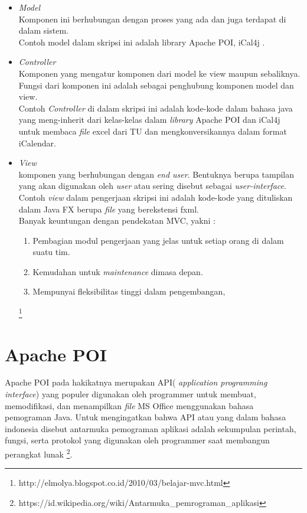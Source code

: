 \begin{itemize}
	\item \textit{Model}\\
	Komponen ini berhubungan dengan proses yang ada dan juga terdapat di dalam sistem.\\
	Contoh model dalam skripsi ini adalah library Apache POI, iCal4j .
	\item \textit{Controller}\\
	Komponen yang mengatur komponen dari model ke view maupun sebaliknya. Fungsi dari komponen ini adalah sebagai penghubung komponen model dan view.\\
	Contoh \textit{Controller} di dalam skripsi ini adalah kode-kode dalam bahasa java yang meng-inherit dari kelas-kelas dalam \textit{library} Apache POI dan iCal4j untuk membaca \textit{file} excel dari TU dan mengkonversikannya dalam format iCalendar.
	\item \textit{View}\\
	komponen yang berhubungan dengan \textit{end user}. Bentuknya berupa tampilan yang akan digunakan oleh \textit{user} atau sering disebut sebagai \textit{user-interface}.
	Contoh \textit{view} dalam pengerjaan skripsi ini adalah kode-kode yang dituliskan dalam Java FX berupa \textit{file} yang berekstensi fxml.\\
	Banyak keuntungan dengan pendekatan MVC, yakni \cite{Hans:2014}:
	\begin{enumerate}
		\item Pembagian modul pengerjaan yang jelas untuk setiap orang di dalam suatu tim.
		\item Kemudahan untuk \textit{maintenance} dimasa depan.
		\item Mempunyai fleksibilitas tinggi dalam pengembangan,
	\end{enumerate}
\footnote{http://elmolya.blogspot.co.id/2010/03/belajar-mvc.html}
\end{itemize}

\section{Apache POI}

Apache POI pada hakikatnya merupakan API( \textit{application programming interface}) yang populer digunakan oleh programmer untuk membuat, memodifikasi, dan menampilkan \textit{file} MS Office menggunakan bahasa pemograman Java. Untuk mengingatkan bahwa API atau yang dalam bahasa indonesia disebut antarmuka pemograman aplikasi adalah sekumpulan perintah, fungsi, serta protokol yang digunakan oleh programmer saat membangun perangkat lunak \footnote{https://id.wikipedia.org/wiki/Antarmuka\_pemrograman\_aplikasi}. 

